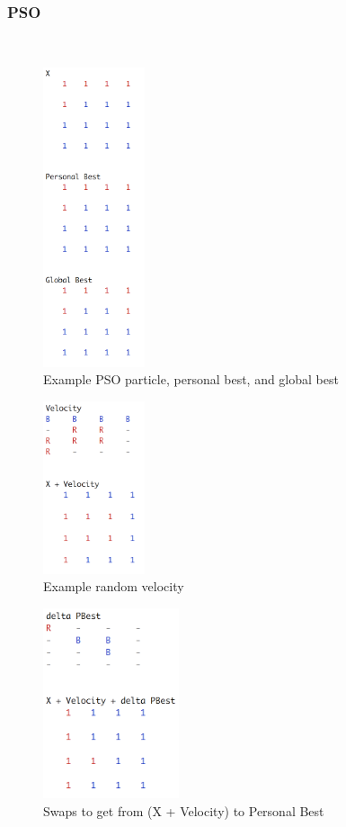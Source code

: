 \documentclass[journal]{IEEEtran}
\begin{document}
\subsubsection{PSO}~\\
\begin{figure}[h!]
    \includegraphics[width=3cm]{pso1.png}
    \centering
    \caption{Example PSO particle, personal best, and global best}
        \label{fig:pso_1}
\end{figure}
\begin{figure}[h!]
    \includegraphics[width=3cm]{pso2.png}
    \centering
    \caption{Example random velocity}
        \label{fig:pso_2}
\end{figure}
\begin{figure}[h!]
    \includegraphics[width=4cm]{pso3.png}
    \centering
    \caption{Swaps to get from (X + Velocity) to Personal Best}
        \label{fig:pso_3}
\end{figure}
\end{document}
